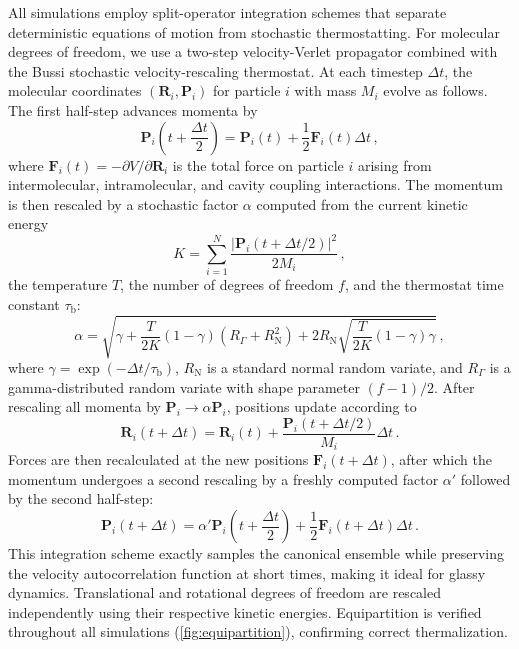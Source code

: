 \documentclass[%
 reprint,
 amsmath,amssymb,
 aps,
]{revtex4-2}
\begin{document}
All simulations employ split-operator integration schemes that separate deterministic equations of motion from stochastic thermostatting.
For molecular degrees of freedom, we use a two-step velocity-Verlet propagator combined with the Bussi stochastic velocity-rescaling thermostat.
At each timestep $\Delta t$, the molecular coordinates $(\bm{R}_i, \bm{P}_i)$ for particle $i$ with mass $M_i$ evolve as follows.
The first half-step advances momenta by
\begin{equation}
\bm{P}_i\left(t + \frac{\Delta t}{2}\right) = \bm{P}_i(t) + \frac{1}{2} \bm{F}_i(t) \Delta t \,,
\end{equation}
where $\bm{F}_i(t) = -\partial V / \partial \bm{R}_i$ is the total force on particle $i$ arising from intermolecular, intramolecular, and cavity coupling interactions.
The momentum is then rescaled by a stochastic factor $\alpha$ computed from the current kinetic energy
\begin{equation}
K = \sum_{i=1}^{N} \frac{|\bm{P}_i(t + \Delta t/2)|^2}{2M_i} \,,
\end{equation}
the temperature $T$, the number of degrees of freedom $f$, and the thermostat time constant $\tau_\mathrm{b}$:
\begin{equation}
\alpha = \sqrt{\gamma + \frac{T}{2K}(1-\gamma)\left(R_\Gamma + R_\mathrm{N}^2\right) + 2R_\mathrm{N}\sqrt{\frac{T}{2K}(1-\gamma)\gamma}} \,,
\end{equation}
where $\gamma = \exp(-\Delta t/\tau_\mathrm{b})$, $R_\mathrm{N}$ is a standard normal random variate, and $R_\Gamma$ is a gamma-distributed random variate with shape parameter $(f-1)/2$.
After rescaling all momenta by $\bm{P}_i \to \alpha \bm{P}_i$, positions update according to
\begin{equation}
\bm{R}_i(t + \Delta t) = \bm{R}_i(t) + \frac{\bm{P}_i(t + \Delta t/2)}{M_i} \Delta t \,.
\end{equation}
Forces are then recalculated at the new positions $\bm{F}_i(t + \Delta t)$, after which the momentum undergoes a second rescaling by a freshly computed factor $\alpha'$ followed by the second half-step:
\begin{equation}
\bm{P}_i(t + \Delta t) = \alpha' \bm{P}_i\left(t + \frac{\Delta t}{2}\right) + \frac{1}{2} \bm{F}_i(t + \Delta t) \Delta t \,.
\end{equation}
This integration scheme exactly samples the canonical ensemble while preserving the velocity autocorrelation function at short times, making it ideal for glassy dynamics.
Translational and rotational degrees of freedom are rescaled independently using their respective kinetic energies.
Equipartition is verified throughout all simulations (\cref{fig:equipartition}), confirming correct thermalization.
\end{document}

